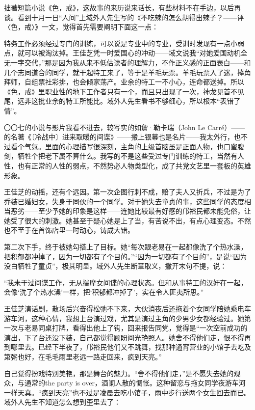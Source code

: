 \par 拙著短篇小说《色，戒》，这故事的来历说来话长，有些材料不在手边，以后再谈。看到十月一日“人间”上域外人先生写的《不吃辣的怎么胡得出辣子？——评〈色，戒〉》一文，觉得首先需要阐明下面这一点：
\par 特务工作必须经过专门的训练，可以说是专业中的专业，受训时发现有一点小弱点，就可以被淘汰掉。王佳芝凭一时爱国心的冲动——域文说我“对她爱国动机全无一字交代，”那是因为我从来不低估读者的理解力，不作正义感的正面表白——和几个志同道合的同学，就干起特工来了，等于是羊毛玩票。羊毛玩票入了迷，捧角拜师，自组票社彩排，也会倾家荡产。业余的特工一不小心，连命都送掉。所以《色，戒》里职业性的地下工作者只有一个，而且只出现了一次，神龙见首不见尾，远非这批业余的特工所能比。域外人先生看书不够细心，所以根本“表错了情”。
\par 〇〇七的小说与影片我看不进去，较写实的如詹·勒卡瑞（John Le Carré）——的名著《〔冷战中〕进来取暖的间谍》——搬上银幕也是名片——我太外行，也不过看个气氛。里面的心理描写很深刻，主角的上级首脑虽是正面人物，也口蜜腹剑，牺牲个把老下属不算什么。我写的不是这些受过专门训练的特工，当然有人性，也有正常的人性的弱点，不然势必人物类型化，成了共党文艺里一套板的英雄形象。
\par 王佳芝的动摇，还有个远因。第一次企图行刺不成，赔了夫人又折兵，不过是为了乔装已婚妇女，失身于同伙的一个同学。对于她失去童贞的事，这些同学的态度相当恶劣——至少予她的印象是这样——连她比较最有好感的邝裕民都未能免俗，让她受了很大的刺激。她甚至于疑心她是上了当，有苦说不出，有点心理变态。不然也不至于在首饰店里一时动心，铸成大错。
\par 第二次下手，终于被她勾搭上了目标。她“每次跟老易在一起都像洗了个热水澡，把积郁都冲掉了，因为一切都有了个目的。”“因为一切都有了个目的”，是说“因为没白牺牲了童贞”，极其明显。域外人先生断章取义，撇开末句不提，说：
\par “我未干过间谍工作，无从揣摩女间谍的心理状态。但和从事特工的汉奸在一起，会像‘洗了个热水澡’一样，把‘积郁都冲掉了’，实在令人匪夷所思。”
\par 王佳芝演话剧，散场后兴奋得松弛不下来，大伙消夜后还拖着个女同学陪她乘电车游车河，这种心情，我想上台演过戏，尤其是演过主角的少男少女都经验过。她第一次与老易同桌打牌，看得出他上了钩，回来报告同党，觉得是“一次空前成功的演出，下了台还没下装，自己都觉得顾盼间光艳照人。她舍不得他们走，恨不得再到哪里去。已经下半夜了，邝裕民他们又不跳舞，找那种通宵营业的小馆子去吃及第粥也好，在毛毛雨里老远一路走回来，疯到天亮。”
\par 自己觉得扮戏特别美艳，那是舞台的魅力。“舍不得他们走，”是不愿失去她的观众，与通常的the party is over，酒阑人散的惆怅。这种留恋与拖女同学夜游车河一样天真。“疯到天亮”也不过是凌晨去吃小馆子，雨中步行送两个女生回去而已。域外人先生不知道怎么想到歪里去了：
